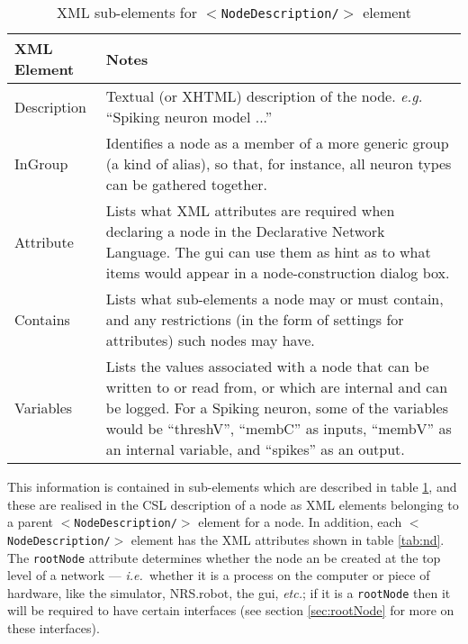 \documentclass[pdftex,a4paper]{article}
\newcommand{\ie}{{\em i.e.\ }}
\newcommand{\eg}{{\em e.g.\ }}
\newcommand{\etc}{{\it etc.}}
\newcommand{\XML}[2][]{{\tt \small $<$#2#1/$>$}}
\newcommand{\XMLfont}[1]{{\tt \small #1}}
\begin{document}
\begin{table}[!h]
  \begin{center}
    \caption{XML sub-elements for \XML{NodeDescription} element}
    \label{tab:sub-nd}
    \begin{tabular}{|l|p{6cm}|}
      \hline

      \textbf{XML Element} & \textbf{Notes}\\

      \hline

      Description & Textual (or XHTML) description of the node. \eg
      ``Spiking neuron model ...'' \\

      \hline

      InGroup & Identifies a node as a member of a more generic group
      (a kind of alias), so that, for instance, all neuron types can
      be gathered together.\\

      \hline

      Attribute & Lists what XML attributes are required when
      declaring a node in the Declarative Network Language. The gui
      can use them as hint as to what items would appear in a
      node-construction dialog box.\\

      \hline

      Contains & Lists what sub-elements a node may or must contain,
      and any restrictions (in the form of settings for attributes)
      such nodes may have.\\

      \hline

      Variables & Lists the values associated with a node that can be
      written to or read from, or which are internal and can be
      logged. For a Spiking neuron, some of the variables would be
      ``threshV'', ``membC'' as inputs, ``membV'' as an internal
      variable, and ``spikes'' as an output.\\

      \hline
    \end{tabular}
  \end{center}
\end{table}

  This information is contained in sub-elements which are described in
table \ref{tab:sub-nd}, and these are realised in the CSL description of
a node as XML elements belonging to a parent \XML{NodeDescription}
element for a node. In addition, each \XML{NodeDescription} element has
the XML attributes shown in table \ref{tab:nd}. The \XMLfont{rootNode}
attribute determines whether the node an be created at the top level of
a network --- \ie whether it is a process on the computer or piece of
hardware, like the simulator, NRS.robot, the gui, \etc; if it is a
\XMLfont{rootNode} then it will be required to have certain interfaces
(see section \ref{sec:rootNode} for more on these interfaces).
\end{document}
